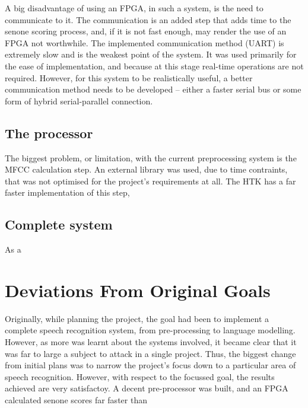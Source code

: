		A big disadvantage of using an FPGA, in such a system, is the need to communicate to it.  The communication is an added step that adds time to the senone scoring process, and, if it is not fast enough, may render the use of an FPGA not worthwhile.  The implemented communication method (UART) is extremely slow and is the weakest point of the system.  It was used primarily for the ease of implementation, and because at this stage real-time operations are not required.  However, for this system to be realistically useful, a better communication method needs to be developed -- either a faster serial bus or some form of hybrid serial-parallel connection.



	\subsection{The processor} %
	\label{sub:analysis_the_processor}
		The biggest problem, or limitation, with the current preprocessing system is the MFCC calculation step.  An external library was used, due to time contraints, that was not optimised for the project's requirements at all.  The HTK has a far faster implementation of this step, 



	\subsection{Complete system} %
	\label{sub:complete_system_analysis}
		As a 


\section{Deviations From Original Goals} %
\label{sec:deviations_from_original_goals}
	Originally, while planning the project, the goal had been to implement a complete speech recognition system, from pre-processing to language modelling.  However, as more was learnt about the systems involved, it became clear that it was far to large a subject to attack in a single project.  Thus, the biggest change from initial plans was to narrow the project's focus down to a particular area of speech recognition.  However, with respect to the focussed goal, the results achieved are very satisfactoy.  A decent pre-processor was built, and an FPGA calculated senone scores far faster than


